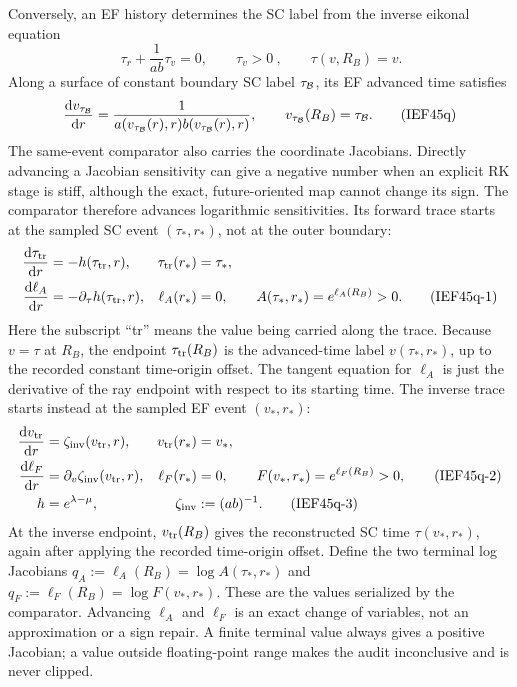 Conversely, an EF history determines the SC label from the inverse eikonal
equation
\[
 \boxed{\ \tau_r+\frac{1}{ab}\tau_v=0,\qquad \tau_v>0\ },
 \qquad \tau(v,R_B)=v .                                 \tag{IEF45p}
\]
Along a surface of constant boundary SC label \(\tau_{\cal B}\), its EF
advanced time satisfies
\[
 \frac{\mathrm d v_{\tau_{\cal B}}}{\mathrm d r}
 =\frac{1}{a(v_{\tau_{\cal B}}(r),r)
             b(v_{\tau_{\cal B}}(r),r)},
 \qquad v_{\tau_{\cal B}}(R_B)=\tau_{\cal B}.         \tag{IEF45q}
\]
The same-event comparator also carries the coordinate Jacobians.  Directly
advancing a Jacobian sensitivity can give a negative number when an explicit
RK stage is stiff, although the exact, future-oriented map cannot change its
sign.  The comparator therefore advances logarithmic sensitivities.  Its
forward trace starts at the sampled SC event \((\tau_*,r_*)\), not at the
outer boundary:
\begin{align}
 \frac{\mathrm d\tau_{\rm tr}}{\mathrm d r}&=-h(\tau_{\rm tr},r),&
 \tau_{\rm tr}(r_*)&=\tau_*,\notag\\
 \frac{\mathrm d\ell_A}{\mathrm d r}&=-\partial_\tau h(\tau_{\rm tr},r),&
 \ell_A(r_*)&=0,\qquad
 A(\tau_*,r_*)=e^{\ell_A(R_B)}>0 .          \tag{IEF45q-1}
\end{align}
Here the subscript ``tr'' means the value being carried along the trace.
Because \(v=\tau\) at \(R_B\), the endpoint
\(\tau_{\rm tr}(R_B)\) is the advanced-time label \(v(\tau_*,r_*)\), up to
the recorded constant time-origin offset.  The tangent equation for
\(\ell_A\) is just the derivative of the ray endpoint with respect to its
starting time.  The inverse trace starts instead at the sampled EF event
\((v_*,r_*)\):
\begin{align}
 \frac{\mathrm d v_{\rm tr}}{\mathrm d r}&=\zeta_{\rm inv}(v_{\rm tr},r),&
 v_{\rm tr}(r_*)&=v_*,\notag\\
 \frac{\mathrm d\ell_F}{\mathrm d r}&=\partial_v\zeta_{\rm inv}(v_{\rm tr},r),&
 \ell_F(r_*)&=0,\qquad
 F(v_*,r_*)=e^{\ell_F(R_B)}>0,               \tag{IEF45q-2}\\
 h&=e^{\lambda-\mu},&\zeta_{\rm inv}&:=(ab)^{-1}.      \tag{IEF45q-3}
\end{align}
At the inverse endpoint, \(v_{\rm tr}(R_B)\) gives the reconstructed SC time
\(\tau(v_*,r_*)\), again after applying the recorded time-origin offset.
Define the two terminal log Jacobians
\(q_A:=\ell_A(R_B)=\log A(\tau_*,r_*)\) and
\(q_F:=\ell_F(R_B)=\log F(v_*,r_*)\).  These are the values serialized by the
comparator.  Advancing \(\ell_A\) and \(\ell_F\) is an exact change of
variables, not an approximation or a sign repair.  A finite terminal value
always gives a positive Jacobian; a value outside floating-point range makes
the audit inconclusive and is never clipped.

